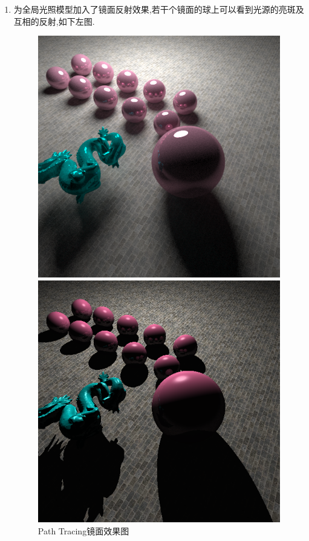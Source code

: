 \begin{enumerate}
  \item 为全局光照模型加入了镜面反射效果,若干个镜面的球上可以看到光源的亮斑及互相的反射,如下左图.
    \begin{figure}[H]
      \begin{minipage}[b]{0.46\linewidth}
        \centering
        \includegraphics[width=\textwidth]{img/gllu_refl.png}
      \end{minipage}
      \begin{minipage}[b]{0.46\linewidth}
        \centering
        \includegraphics[width=\textwidth]{img/compare_refl_phong.png}
      \end{minipage}
      \caption{Path Tracing镜面效果图\label{fig:pt_refl}}
    \end{figure}


\end{enumerate}
